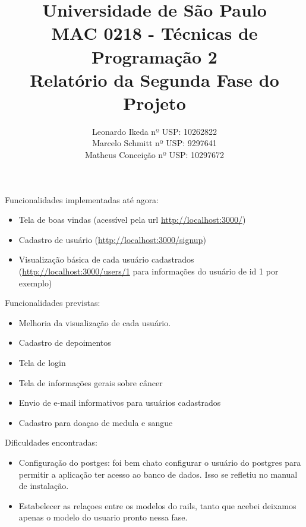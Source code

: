 \documentclass[12pt,a4paper]{article}
\title{{\bf Universidade de São Paulo} \\MAC 0218 - Técnicas de Programação 2 \\ Relatório da Segunda Fase do Projeto}
\author{Leonardo Ikeda     nº USP: 10262822 \\
	    Marcelo Schmitt    nº USP: 9297641\\
	    Matheus Conceição  nº USP: 10297672}
\begin{document}
\date{}
\maketitle


\noindent Funcionalidades implementadas até agora:
\begin{itemize}
	\item Tela de boas vindas (acessível pela url \url{http://localhost:3000/})
	\item Cadastro de usuário (\url{http://localhost:3000/signup})
	\item Visualização básica de cada usuário cadastrados (\url{http://localhost:3000/users/1} para informações do usuário de id 1 por exemplo)
\end{itemize}

\noindent Funcionalidades previstas:
\begin{itemize}
	\item Melhoria da visualização de cada usuário.
	\item Cadastro de depoimentos
	\item Tela de login
	\item Tela de informações gerais sobre câncer
	\item Envio de e-mail informativos para usuários cadastrados
	\item Cadastro para doaçao de medula e sangue
\end{itemize}

\noindent Dificuldades encontradas:
\begin{itemize}
	\item Configuração do postges: foi bem chato configurar o usuário do postgres para permitir a aplicação ter acesso ao banco de dados. Isso se refletiu no manual de instalação.
	\item Estabelecer as relaçoes entre os modelos do rails, tanto que acebei deixamos apenas o modelo do usuario pronto nessa fase.
\end{itemize}
\end{document}
